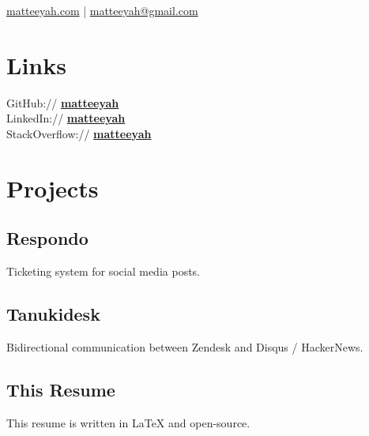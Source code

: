 \documentclass[]{matija-resume}
\begin{document}
%
%
\lastupdated

%
%
 {
\href{https://matteeyah.com}{matteeyah.com} |
\href{mailto:matteeyah@gmail.com}{matteeyah@gmail.com}
}

%
%

\begin{minipage}[t]{0.33\textwidth}



\section{Links}
GitHub:// \href{https://github.com/matteeyah}{\bf matteeyah \faExternalLink} \\
LinkedIn://  \href{https://www.linkedin.com/in/matteeyah}{\bf matteeyah \faExternalLink} \\
StackOverflow://  \href{https://stackoverflow.com/users/1139722/matteeyah}{\bf matteeyah \faExternalLink}


\section{Projects}
\subsection{Respondo}
Ticketing system for social media posts.
\sectionsep

\subsection{Tanukidesk}
Bidirectional communication between Zendesk and Disqus / HackerNews.
\sectionsep

\subsection{This Resume}
This resume is written in LaTeX and open-source.


\end{minipage}
\end{document}
